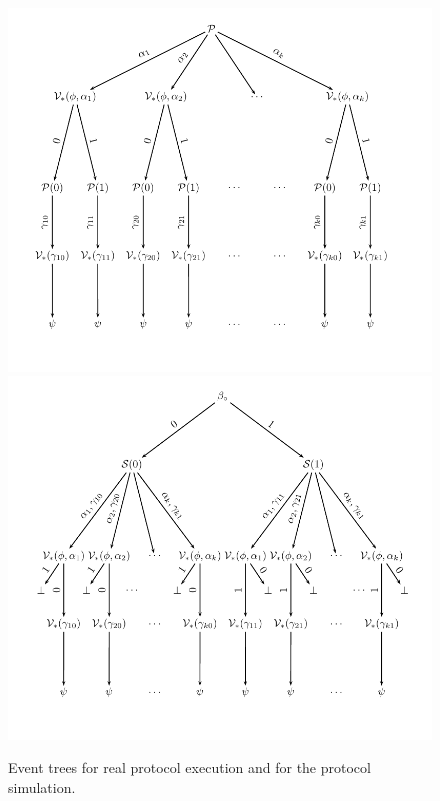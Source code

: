 \documentclass{crypto-exercise}
\begin{document}
\begin{solution}
\begin{figure}[h]
   \centering
   \includegraphics[scale=0.55]{figures/1101-event-tree-i}
   \includegraphics[scale=0.55]{figures/1101-event-tree-ii}
   \caption{Event trees for real protocol execution and for the protocol simulation.}
   \label{fig:event-trees}
\end{figure}


\end{solution}
\end{document}
